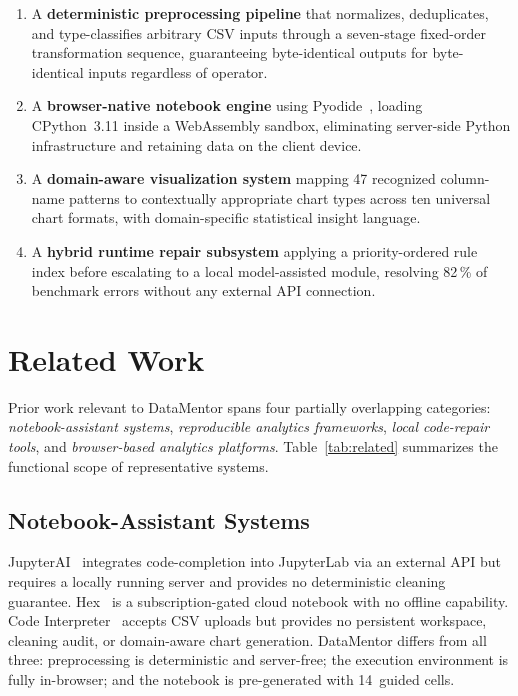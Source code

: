 \documentclass[conference]{IEEEtran}
\begin{document}
\begin{enumerate}[leftmargin=*,itemsep=1pt,topsep=2pt]
  \item A \textbf{deterministic preprocessing pipeline} that normalizes,
        deduplicates, and type-classifies arbitrary CSV inputs through a
        seven-stage fixed-order transformation sequence, guaranteeing
        byte-identical outputs for byte-identical inputs regardless of
        operator.
  \item A \textbf{browser-native notebook engine} using Pyodide~\cite{pyodide2021},
        loading CPython~3.11 inside a WebAssembly sandbox, eliminating
        server-side Python infrastructure and retaining data on the
        client device.
  \item A \textbf{domain-aware visualization system} mapping 47 recognized
        column-name patterns to contextually appropriate chart types across
        ten universal chart formats, with domain-specific statistical
        insight language.
  \item A \textbf{hybrid runtime repair subsystem} applying a
        priority-ordered rule index before escalating to a local
        model-assisted module, resolving 82\,\% of benchmark errors
        without any external API connection.
\end{enumerate}

\section{Related Work}
\label{sec:related}

Prior work relevant to DataMentor spans four partially overlapping
categories: \emph{notebook-assistant systems}, \emph{reproducible
analytics frameworks}, \emph{local code-repair tools}, and
\emph{browser-based analytics platforms}. Table~\ref{tab:related}
summarizes the functional scope of representative systems.

\subsection{Notebook-Assistant Systems}

JupyterAI~\cite{jupyterai2023} integrates code-completion into
JupyterLab via an external API but requires a locally running server
and provides no deterministic cleaning guarantee. Hex~\cite{hex2023} is a
subscription-gated cloud notebook with no offline capability. Code
Interpreter~\cite{openai2023} accepts CSV uploads but provides no
persistent workspace, cleaning audit, or domain-aware chart generation.
DataMentor differs from all three: preprocessing is deterministic and
server-free; the execution environment is fully in-browser; and the
notebook is pre-generated with 14~guided cells.
\end{document}

